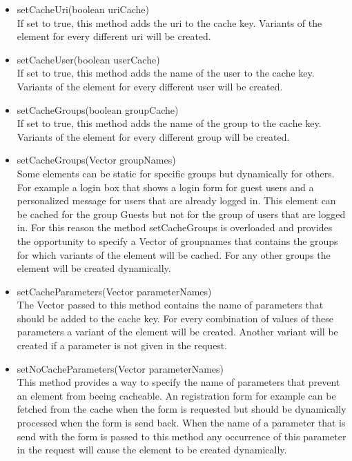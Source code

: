 \begin{itemize}
\item {\meth setCacheUri(boolean uriCache)}\\
If set to true, this method adds the uri to the cache key. 
Variants of the element  for every different uri will be created.

\item {\meth setCacheUser(boolean userCache)}\\
If set to true, this method adds the name of the user to the cache key. 
Variants of the element for every different user will be created. 

\item {\meth setCacheGroups(boolean groupCache)}\\
If set to true, this method adds the name of the group to the cache key.
Variants of the element for every different group will be created.

\item {\meth setCacheGroups(Vector groupNames)}\\
Some elements can be static for specific groups but dynamically for others. 
For example a login box that shows a login form for guest users and a personalized 
message for users that are already logged in. This element can be cached for the 
group Guests but not for the group of users that are logged in. 
For this reason the method {\meth setCacheGroups} is overloaded and provides the 
opportunity to specify a Vector of groupnames  that contains the groups for 
which variants of the element will be cached. For any other groups 
the element will be created dynamically.

\item {\meth setCacheParameters(Vector parameterNames)}\\
The Vector passed to this method contains the name of parameters that should be 
added to the cache key. For every combination of values of these parameters a 
variant of the element will be created.
Another variant will be created if a parameter is not given in the request.

\item {\meth setNoCacheParameters(Vector parameterNames)}\\
This method provides a way to specify the name of parameters that prevent an 
element from beeing cacheable. An registration form for example can be fetched 
from the cache when the form is requested but should be dynamically processed 
when the form is send back. When the name of a parameter that is send with the 
form is passed to this method any occurrence of this parameter in the request will 
cause the element to be created dynamically.


\end{itemize}
